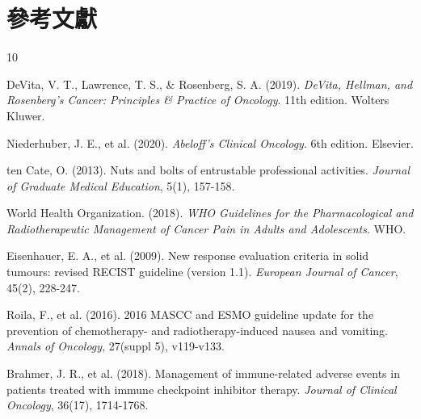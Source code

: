 \documentclass[12pt,a4paper]{article}
\begin{document}
\section{參考文獻}
\begin{thebibliography}{10}

DeVita, V. T., Lawrence, T. S., \& Rosenberg, S. A. (2019). \textit{DeVita, Hellman, and Rosenberg's Cancer: Principles \& Practice of Oncology}. 11th edition. Wolters Kluwer.

Niederhuber, J. E., et al. (2020). \textit{Abeloff's Clinical Oncology}. 6th edition. Elsevier.

ten Cate, O. (2013). Nuts and bolts of entrustable professional activities. \textit{Journal of Graduate Medical Education}, 5(1), 157-158.

World Health Organization. (2018). \textit{WHO Guidelines for the Pharmacological and Radiotherapeutic Management of Cancer Pain in Adults and Adolescents}. WHO.

Eisenhauer, E. A., et al. (2009). New response evaluation criteria in solid tumours: revised RECIST guideline (version 1.1). \textit{European Journal of Cancer}, 45(2), 228-247.

Roila, F., et al. (2016). 2016 MASCC and ESMO guideline update for the prevention of chemotherapy- and radiotherapy-induced nausea and vomiting. \textit{Annals of Oncology}, 27(suppl 5), v119-v133.

Brahmer, J. R., et al. (2018). Management of immune-related adverse events in patients treated with immune checkpoint inhibitor therapy. \textit{Journal of Clinical Oncology}, 36(17), 1714-1768.

\end{thebibliography}
\end{document}
